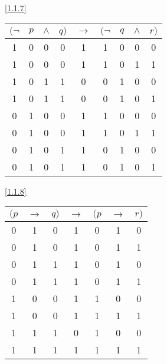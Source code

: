 \documentclass[boxes]{homework}
\begin{document}
\begin{solution}
    \ref{1.1.7}
    \begin{center}
        \begin{tabular}{cccc|c|cccc}
            $(\lnot$ & $p$ & $\land$ & $q)$ & $\to$ & $(\lnot$ & $q$ & $\land$ & $r)$ \\
            \hline
            1        & 0   & 0       & 0    & 1     & 1        & 0   & 0       & 0    \\
            1        & 0   & 0       & 0    & 1     & 1        & 0   & 1       & 1    \\
            1        & 0   & 1       & 1    & 0     & 0        & 1   & 0       & 0    \\
            1        & 0   & 1       & 1    & 0     & 0        & 1   & 0       & 1    \\
            0        & 1   & 0       & 0    & 1     & 1        & 0   & 0       & 0    \\
            0        & 1   & 0       & 0    & 1     & 1        & 0   & 1       & 1    \\
            0        & 1   & 0       & 1    & 1     & 0        & 1   & 0       & 0    \\
            0        & 1   & 0       & 1    & 1     & 0        & 1   & 0       & 1
        \end{tabular}
    \end{center}
    \ref{1.1.8}
    \begin{center}
        \begin{tabular}{ccc|c|ccc}
            $(p$ & $\to$ & $q)$ & $\to$ & $(p$ & $\to$ & $r)$ \\
            \hline
            0    & 1     & 0    & 1     & 0    & 1     & 0    \\
            0    & 1     & 0    & 1     & 0    & 1     & 1    \\
            0    & 1     & 1    & 1     & 0    & 1     & 0    \\
            0    & 1     & 1    & 1     & 0    & 1     & 1    \\
            1    & 0     & 0    & 1     & 1    & 0     & 0    \\
            1    & 0     & 0    & 1     & 1    & 1     & 1    \\
            1    & 1     & 1    & 0     & 1    & 0     & 0    \\
            1    & 1     & 1    & 1     & 1    & 1     & 1
        \end{tabular}
    \end{center}

\end{solution}
\end{document}

